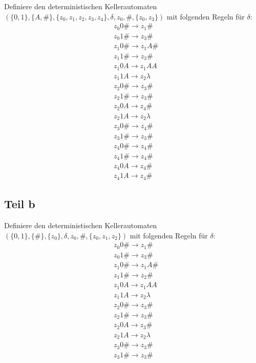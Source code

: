 \documentclass[10pt,a4paper]{article}
\begin{document}
Definiere den deterministischen Kellerautomaten $(\{ 0, 1 \}, \{ A, \# \}, \{ z_{0}, z_{1}, z_{2}, z_{3}, z_{4} \}, \delta, z_{0}, \#, \{ z_{0}, z_{3} \})$ mit folgenden Regeln für $\delta$:
\begin{align*}
  & z_{0}0\# \rightarrow z_{1}\#\\
  & z_{0}1\# \rightarrow z_{3}\#\\
  & z_{1}0\# \rightarrow z_{1}A\#\\
  & z_{1}1\# \rightarrow z_{3}\#\\
  & z_{1}0A \rightarrow z_{1}AA\\
  & z_{1}1A \rightarrow z_{2}\lambda\\
  & z_{2}0\# \rightarrow z_{3}\#\\
  & z_{2}1\# \rightarrow z_{3}\#\\
  & z_{2}0A \rightarrow z_{4}\#\\
  & z_{2}1A \rightarrow z_{2}\lambda\\
  & z_{3}0\# \rightarrow z_{4}\#\\
  & z_{3}1\# \rightarrow z_{3}\#\\
  & z_{4}0\# \rightarrow z_{4}\#\\
  & z_{4}1\# \rightarrow z_{4}\#\\
  & z_{4}0A \rightarrow z_{4}\#\\
  & z_{4}1A \rightarrow z_{4}\#
\end{align*}

\subsection{Teil b}

Definiere den deterministischen Kellerautomaten $(\{ 0, 1 \}, \{ \# \}, \{ z_{0} \}, \delta, z_{0}, \#, \{ z_{0}, z_{1}, z_{2} \})$ mit folgenden Regeln für $\delta$:
\begin{align*}
  & z_{0}0\# \rightarrow z_{1}\#\\
  & z_{0}1\# \rightarrow z_{3}\#\\
  & z_{1}0\# \rightarrow z_{1}A\#\\
  & z_{1}1\# \rightarrow z_{2}\#\\
  & z_{1}0A \rightarrow z_{1}AA\\
  & z_{1}1A \rightarrow z_{2}\lambda\\
  & z_{2}0\# \rightarrow z_{3}\#\\
  & z_{2}1\# \rightarrow z_{3}\#\\
  & z_{2}0A \rightarrow z_{3}\#\\
  & z_{2}1A \rightarrow z_{2}\lambda\\
  & z_{3}0\# \rightarrow z_{3}\#\\
  & z_{3}1\# \rightarrow z_{3}\#\\
\end{align*}
\end{document}
